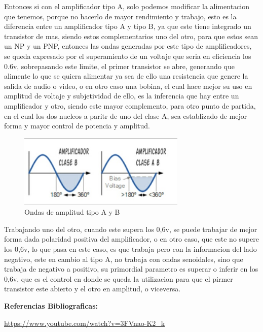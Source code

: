\documentclass[12pt,a4paper]{article}
\begin{document}
Entonces si con el amplificador tipo A, solo podemos modificar la alimentacion que tenemos, porque no hacerlo de mayor rendimiento y trabajo, esto es la diferencia entre un amplificador tipo A y tipo B, ya que este tiene integrado un transistor de mas, siendo estos complementarios uno del otro, para que estos sean un NP y un PNP, entonces las  ondas generadas por este tipo de amplificadores, se queda expresado por el superamiento de un voltaje que seria en eficiencia los 0.6v, sobrepasando este limite, el primer transistor se abre, generando que alimente lo que se quiera alimentar ya sea de ello una resistencia que genere la salida de audio o video, o en otro caso una bobina, el cual hace mejor su uso en amplitud de voltaje y subjetividad de ello, es la inferencia que hay entre un amplificador y otro, siendo este mayor complemento, para otro punto de partida, en el cual los dos nucleos a paritr de uno del clase A, sea establizado de mejor forma y mayor control de potencia y amplitud.\\

\begin{figure}[hbtp]
\centering
\includegraphics[width=8cm]{5.jpg}
\caption{Ondas de amplitud tipo A y B}
\end{figure}


Trabajando uno del otro, cuando este supera los 0,6v, se puede trabajar de mejor forma dada polaridad positiva del amplificador, o en otro caso, que este no supere los 0,6v, lo que pasa en este caso, es que trabaja pero con la informacion del lado negativo, este en cambio al tipo A, no trabaja con ondas senoidales, sino que trabaja de negativo a positivo, su primordial parametro es superar o inferir en los 0,6v, que es el control en donde se queda la utilizacion para que el pirmer transistor este abierto y el otro en amplitud, o viceversa.

\textbf{Referencias Bibliograficas:}

\url{https://www.youtube.com/watch?v=3FVnao-K2_k}
\end{document}
